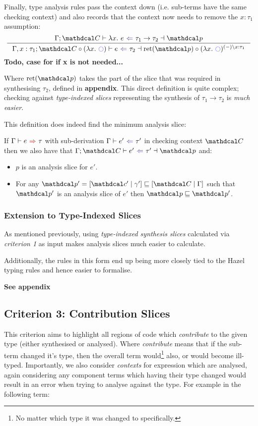 Finally, type analysis rules pass the context down (i.e. sub-terms have the same checking context) and also records that the context now needs to remove the $x:\tau_1$ assumption:
\[\inference{\analysisslice{\C}{\lambda x.\ e}{\tau_1 \to \tau_2}{\p}}{\analysisslice[\Gamma, x:\tau_1]{\C \circ (\lambda x.\ \cmark)}{e}{\tau_2}{\mathrm{ret}(\p)}\circ(\lambda x.\ \cmark)^{(-)\backslash x:\tau_1}}\]
\textbf{Todo, case for if x is not needed...}


Where $\mathrm{ret}(\p)$ takes the part of the slice that was required in synthesising $\tau_2$, defined in \textbf{appendix}. This direct definition is quite complex; checking against \textit{type-indexed slices} representing the synthesis of $\tau_1 \to \tau_2$ is \textit{much easier}.

This definition does indeed find the minimum analysis slice:
\begin{conjecture}[Correctness]\label{conj:AnalysisSliceCorrectness}
If $\synthesis{e}{\tau}$ with sub-derivation $\analysis{e'}{\tau'}$ in checking context $\C$ then we also have that $\analysisslice{\C}{e'}{\tau'}{\p}$ and:
\begin{itemize}
\item $p$ is an analysis slice for $e'$.
\item For any $\p' = [\Cs' \mid \gamma'] \sqsubseteq [\C\mid \Gamma]$ such that $\p'$ is an analysis slice of $e'$ then $\p \sqsubseteq \p'$.
\end{itemize}
\end{conjecture}

\subsubsection{Extension to Type-Indexed Slices}
As mentioned previously, using \textit{type-indexed synthesis slices} calculated via \textit{criterion 1} as input makes analysis slices much easier to calculate. 

Additionally, the rules in this form end up being more closely tied to the Hazel typing rules and hence easier to formalise.

\textbf{See appendix}

\subsection{Criterion 3: Contribution Slices}
\label{sec:ContributionSlices}
This criterion aims to highlight all regions of code which \textit{contribute} to the given type (either synthesised or analysed). Where \textit{contribute} means that if the sub-term changed it's type, then the overall term would\footnote{No matter which type it was changed to specifically.} also, or would become ill-typed. Importantly, we also consider \textit{contexts} for expression which are analysed, again considering any component terms which having their type changed would result in an error when trying to analyse against the type. For example in the following term:

